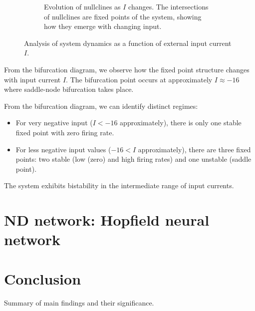 \documentclass{article}
\begin{document}
\begin{figure}[H]
\begin{subfigure}{0.48\textwidth}
        \caption{Evolution of nullclines as $I$ changes. The intersections of nullclines are fixed points of the system, showing how they emerge with changing input.}
        \label{fig:nullcline_evolution}
    \end{subfigure}
    \caption{Analysis of system dynamics as a function of external input current $I$.}
    \label{fig:bifurcation_analysis_combined}
\end{figure}

\bigskip
From the bifurcation diagram, we observe how the fixed point structure changes with input current $I$. The bifurcation point occurs at approximately $I \approx -16$ where saddle-node bifurcation takes place.


From the bifurcation diagram, we can identify distinct regimes:
\begin{itemize}
    \item For very negative input ($I < -16$ approximately), there is only one stable fixed point with zero firing rate.
    \item For less negative input values ($-16 < I $ approximately), there are three fixed points: two stable (low (zero) and high firing rates) and one unstable (saddle point).

\end{itemize}

The system exhibits bistability in the intermediate range of input currents. 




\section{ND network: Hopfield neural network}






\section{Conclusion}

Summary of main findings and their significance.
\end{document}
